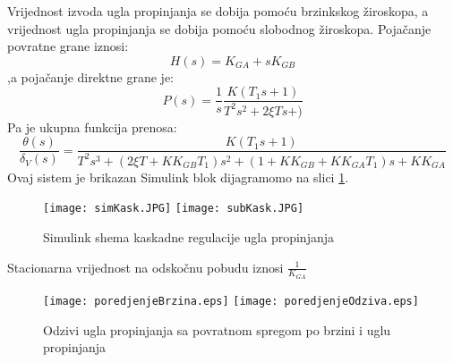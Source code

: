 Vrijednost izvoda ugla propinjanja se dobija pomoću brzinkskog žiroskopa, a 
vrijednost ugla propinjanja se dobija pomoću slobodnog žiroskopa. Pojačanje povratne 
grane iznosi:
\begin{equation}
    H(s)=K_{GA}+sK_{GB}
\end{equation}
,a pojačanje direktne grane je:
\begin{equation}
    P(s)=\frac{1}{s}\frac{K(T_1s+1)}{T^2s^2+2\xi Ts+)}
\end{equation}
Pa je ukupna funkcija prenosa:
\begin{equation}
    \frac{\theta(s)}{\delta _V(s)} = \frac{K(T_1s+1)}{T^2s^3+
    (2\xi T+KK_{GB}T_1)s^2+(1+KK_{GB}+KK_{GA}T_1)s+KK_{GA}}
\end{equation}
Ovaj sistem je brikazan Simulink blok dijagramomo na slici \ref{fig:simuKask}.
\begin{figure}[!ht]
    \centering
    \texttt{[image: simKask.JPG]}
    \texttt{[image: subKask.JPG]}
    \caption{Simulink shema kaskadne regulacije ugla propinjanja}
    \label{fig:simuKask}
\end{figure}
Stacionarna vrijednost na odskočnu pobudu iznosi $\frac{1}{K_{GA}}$
\begin{figure}[!ht]
    \centering
    \texttt{[image: poredjenjeBrzina.eps]}
    \texttt{[image: poredjenjeOdziva.eps]}
    \caption{Odzivi ugla propinjanja sa povratnom spregom po brzini i uglu propinjanja}
\end{figure}
